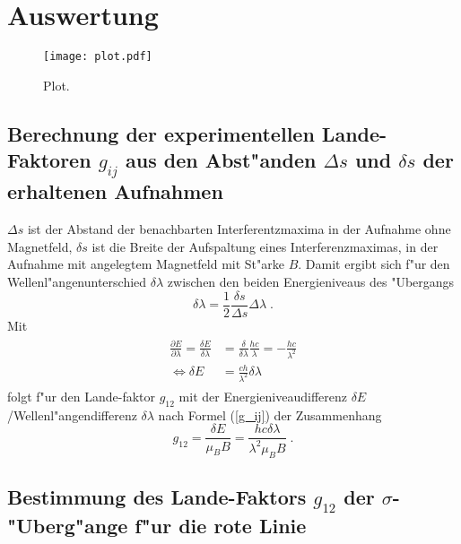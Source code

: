 \section{Auswertung}
\label{sec:Auswertung}

\begin{figure}
  \centering
  \texttt{[image: plot.pdf]}
  \caption{Plot.}
  \label{fig:plot}
\end{figure}


  \subsection{\texorpdfstring{Berechnung der experimentellen Lande-Faktoren $g_{ij}$ aus den Abst"anden $\Delta s$ und $\delta s$ der erhaltenen Aufnahmen}{Berechnung der experimentellen Lande-Faktoren g_{ij} aus den Abst"anden Delta s und delta s der erhaltenen Aufnahmen}}

  $\Delta s$ ist der Abstand der benachbarten Interferentzmaxima in der Aufnahme ohne Magnetfeld, $\delta s$ ist die Breite der Aufspaltung eines Interferenzmaximas, in der Aufnahme mit angelegtem Magnetfeld mit St"arke $B$.
  Damit ergibt sich f"ur den Wellenl"angenunterschied $\delta \lambda$ zwischen den beiden Energieniveaus des "Ubergangs
  \begin{equation}
    \delta \lambda = \frac{1}{2}\frac{\delta s}{\Delta s} \Delta \lambda \; .
  \end{equation}
  Mit
  \begin{align}
    \begin{split}
    \frac{\partial E}{\partial \lambda} = \frac{\delta E}{\delta \lambda} &= \frac{\delta}{\delta \lambda} \frac{hc}{\lambda} = -\frac{hc}{\lambda^2}\\
    \iff \delta E &= \frac{ch}{\lambda^2} \delta \lambda
   \end{split}
  \end{align}
  folgt f"ur den Lande-faktor $g_{12}$ mit der Energieniveaudifferenz $\delta E$/Wellenl"angendifferenz $\delta \lambda$ nach Formel (\ref{g_ij}) der Zusammenhang
  \begin{equation}
    g_{12}=\frac{\delta E}{\mu_BB}=\frac{hc\delta \lambda}{\lambda^2\mu_BB} \; .
  \end{equation}


  \subsection{\texorpdfstring{Bestimmung des Lande-Faktors $g_{12}$ der $\sigma$-"Uberg"ange f"ur die rote Linie}{Bestimmung des Lande-Faktors g_{12} der sigma-"Uberg"ange f"ur die rote Linie}}

